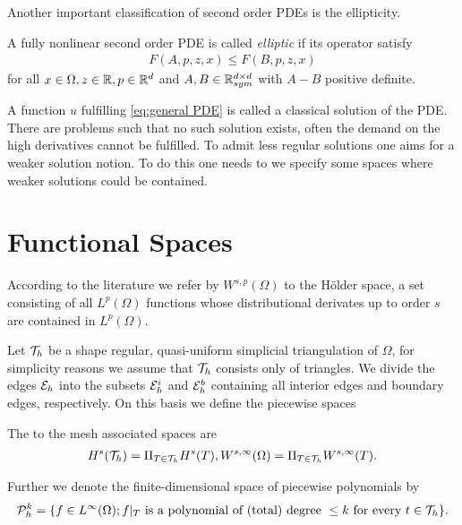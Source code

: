 Another important classification of second order PDEs is the ellipticity. 
\begin{definition}
	A fully nonlinear second order PDE is called \emph{elliptic} if its operator satisfy
	\begin{align}
		F(A,p,z,x) \leq F(B,p,z,x) \label{eq: ellipitic PDE}
	\end{align}
for all $x \in \Omega, z \in \mathbb{R}, p \in \mathbb{R}^d$ and $A,B \in \mathbb{R}^{d \times d}_{sym}$  with $A-B$ positive definite.
\end{definition}

A function $u$ fulfilling \eqref{eq:general PDE} is called a classical solution of the PDE. There are problems such that no such solution exists, often the demand on the high derivatives cannot be fulfilled. To admit less regular solutions one aims for a weaker solution notion. To do this one needs to we specify some spaces where weaker solutions could be contained.

\section{Functional Spaces}
According to the literature we refer by $W^{s,p}(\Omega)$ to the H\"older space, a set consisting of all $L^p(\Omega)$ functions whose distributional derivates up to order $s$ are contained in $L^ p(\Omega)$.

Let $\mathcal{T}_h$ be a shape regular, quasi-uniform simplicial triangulation of $\Omega$, for simplicity reasons we assume that $\mathcal{T}_h$ consists only of triangles. We divide the edges $\mathcal{E}_h$ into the subsets $\mathcal{E}_h^i$ and $\mathcal{E}_h^b$ containing all interior edges and boundary edges, respectively. On this basis we define the piecewise spaces
\begin{definition}
The to the mesh associated spaces are
\begin{align}
	H^s(\mathcal{T}_h) = \Pi_{T\in \mathcal{T}_h}  H^s(T), W^{s,\infty}(\Omega) = \Pi_{T\in \mathcal{T}_h} W^{s,\infty}(T).
\end{align}	
\end{definition}
\begin{definition} \label{def: piecewise polySpace}
	Further we denote the finite-dimensional space of piecewise polynomials by
\[	
	\mathcal P^k_h = \{ f \in L^\infty(\Omega); f \arrowvert_T \textnormal{ is a polynomial of (total) degree } \leq k \textnormal{ for every } t \in \mathcal T_h\}.
\]
\end{definition}

